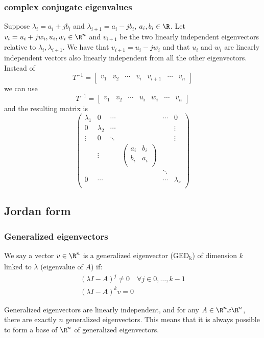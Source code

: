 \documentclass[english]{lectures}
\begin{document}
\subsubsection{complex conjugate eigenvalues}
Suppose $\lambda_i = a_i+jb_i$ and $\lambda_{i+1}=a_i-jb_i$, $a_i,b_i \in \R$. Let $v_i=u_i+jw_i, u_i,w_i \in \R^n$ and $v_{i+1}$ be the two linearly independent eigenvectors relative to $\lambda_i, \lambda_{i+1}$. We have that $v_{i+1}=u_i-jw_i$ and that $u_i$ and $w_i$ are linearly independent vectors also linearly independent from all the other eigenvectors.\\
Instead of
\[
T^{-1} = \begin{bmatrix}
    v_1 & v_2 & \cdots & v_i & v_{i+1} & \cdots & v_n
\end{bmatrix}
\]
we can use
\[
T^{-1} = \begin{bmatrix}
    v_1 & v_2 & \cdots & u_i & w_i & \cdots & v_n
\end{bmatrix}
\]
and the resulting matrix is
\[
\begin{pmatrix}
    \lambda_1 & 0 & \cdots & & \cdots & 0 \\
    0 & \lambda_2 & \cdots & &  & \vdots \\
    \vdots & 0 & \ddots & & & \vdots \\
     & \vdots & & \begin{pmatrix}
         a_i & b_i \\
         b_i & a_i \\
     \end{pmatrix} & & \\
      & & & & \ddots & \\
     0 & \cdots & & & \cdots& \lambda_r\\
\end{pmatrix}
\]


\subsection{Jordan form}
\subsubsection{Generalized eigenvectors}
\begin{definition}
    We say a vector $v \in \R^n$ is a generalized eigenvector (GED\textsubscript{k}) of dimension $k$ linked to $\lambda$ (eigenvalue of $A$) if:
    \begin{gather*}
        (\lambda I -A)^j \neq 0 \quad \forall j \in 0,\dots,k-1 \\
        (\lambda I -A)^kv=0   
    \end{gather*}
\end{definition}
Generalized eigenvectors are linearly independent, and for any $A \in \R^nx\R^n$, there are exactly $n$ generalized eigenvectors. This means that it is always possible to form a base of $\R^n$ of generalized eigenvectors.
\end{document}
